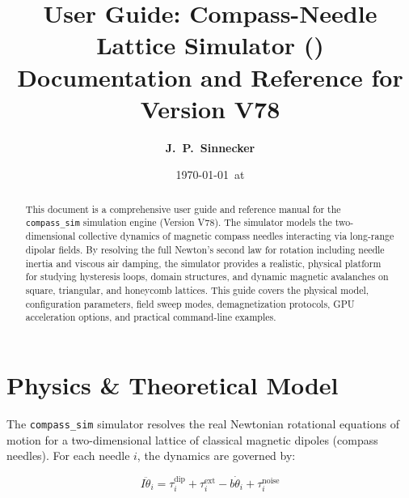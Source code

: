 \documentclass[11pt,a4paper]{article}
\title{\textbf{User Guide: Compass-Needle Lattice Simulator (\code{compass\_sim})}\\[1ex]
\large Documentation and Reference for Version V78}
\author{\textbf{J.~P.~Sinnecker}}
\date{\today\ at \compileTime}
\newcommand{\code}[1]{\texttt{#1}}
\begin{document}
\maketitle

\begin{abstract}
\noindent
This document is a comprehensive user guide and reference manual for the \code{compass\_sim} simulation engine (Version V78). The simulator models the two-dimensional collective dynamics of magnetic compass needles interacting via long-range dipolar fields. By resolving the full Newton's second law for rotation including needle inertia and viscous air damping, the simulator provides a realistic, physical platform for studying hysteresis loops, domain structures, and dynamic magnetic avalanches on square, triangular, and honeycomb lattices. This guide covers the physical model, configuration parameters, field sweep modes, demagnetization protocols, GPU acceleration options, and practical command-line examples.
\end{abstract}

\tableofcontents
\newpage

\section{Physics \& Theoretical Model}
\label{sec:physics}

The \code{compass\_sim} simulator resolves the real Newtonian rotational equations of motion for a two-dimensional lattice of classical magnetic dipoles (compass needles). For each needle $i$, the dynamics are governed by:

\begin{equation}
I \ddot{\theta}_i = \tau_i^{\text{dip}} + \tau_i^{\text{ext}} - b \dot{\theta}_i + \tau_i^{\text{noise}}
\label{eq:motion}
\end{equation}
\end{document}

